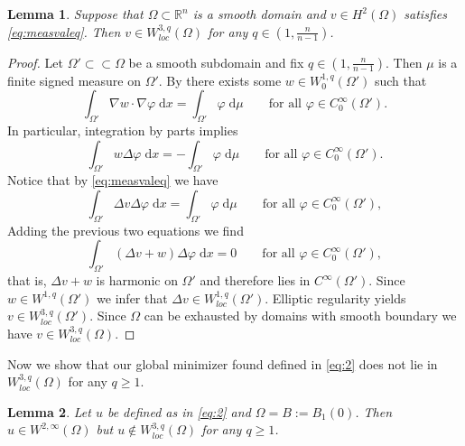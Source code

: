 \documentclass[twoside,11pt]{article}
\newtheorem{lemma}{Lemma}
\theoremstyle{definition}
\begin{document}
\begin{lemma}
    Suppose that $\Omega \subset \mathbb{R}^n$ is a smooth domain and $v \in H^2(\Omega)$ satisfies \eqref{eq:measvaleq}. Then $v \in W^{3,q}_{loc}(\Omega)$ for any $ q \in (1,\frac{n}{n-1})$. 
\end{lemma}
\begin{proof}
    Let $\Omega' \subset\subset \Omega$ be a smooth subdomain and fix $q \in (1,\frac{n}{n-1})$. Then $\mu$ is a finite signed measure on $\Omega'$. By \cite[Proposition 5.1]{Ponce} there exists some $w \in W^{1,q}_0(\Omega')$ such that 
    \begin{equation*}
        \int_{\Omega'} \nabla w \cdot \nabla \varphi \; \mathrm{d}x = \int_{\Omega'} \varphi \; \mathrm{d}\mu \qquad \textrm{for all $\varphi \in C_0^\infty(\Omega')$.}
    \end{equation*}
    In particular, integration by parts implies 
    \begin{equation*}
       \int_{\Omega'} w  \Delta \varphi \; \mathrm{d}x = - \int_{\Omega'} \varphi \; \mathrm{d}\mu \qquad \textrm{for all $\varphi \in C_0^\infty(\Omega')$.}
    \end{equation*}
   Notice that by \eqref{eq:measvaleq} we have 
    \begin{equation*}
    \int_{\Omega'} \Delta v \Delta \varphi \; \mathrm{d}x = \int_{\Omega'} \varphi \; \mathrm{d}\mu \qquad \textrm{for all $\varphi \in C_0^\infty(\Omega')$},
\end{equation*}
Adding the previous two equations we find 
\begin{equation*}
    \int_{\Omega'} (\Delta v + w ) \Delta \varphi \; \mathrm{d}x = 0 \qquad \textrm{for all $\varphi \in C_0^\infty(\Omega')$},
\end{equation*}
that is, $\Delta v+ w$ is harmonic on $\Omega'$ and therefore lies in  $C^\infty(\Omega')$. Since $w \in W^{1,q}(\Omega')$ we infer that $\Delta v \in W^{1,q}_{loc}(\Omega')$. Elliptic regularity yields $v \in W^{3,q}_{loc}(\Omega')$. Since $\Omega$ can be exhausted by domains with smooth boundary we have $v \in W^{3,q}_{loc}(\Omega)$. 
\end{proof}
Now we show that our global minimizer found defined in \eqref{eq:2} does not lie in $W^{3,q}_{loc}(\Omega)$ for any $q \geq 1$.
\begin{lemma}
    Let $u$ be defined as in \eqref{eq:2} and $\Omega =B:=B_1(0)$. Then $u \in W^{2,\infty}(\Omega)$ but $u \not \in W^{3,q}_{loc}(\Omega)$ for any $q \geq 1$. 
\end{lemma}
\end{document}
